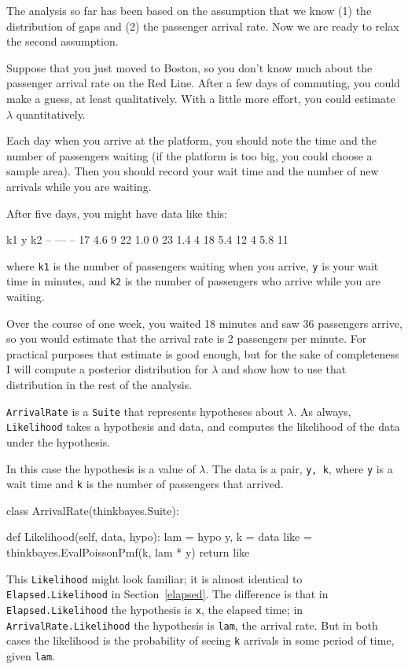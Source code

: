 \documentclass[12pt]{book}
\theoremstyle{exercise}
\begin{document}
The analysis so far has been based on the assumption that we know (1)
the distribution of gaps and (2) the passenger arrival rate.  Now we
are ready to relax the second assumption.

Suppose that you just moved to Boston, so you don't know much about
the passenger arrival rate on the Red Line.  After a few days of
commuting, you could make a guess, at least qualitatively.  With
a little more effort, you could estimate $\lambda$ quantitatively.

Each day when you arrive at the platform, you should note the
time and the number of passengers waiting (if the platform is too
big, you could choose a sample area).  Then you should record your
wait time and the
number of new arrivals while you are waiting.

After five days, you might have data like this:
%
\begin{code}
k1      y     k2
--     ---    --
17     4.6     9
22     1.0     0
23     1.4     4
18     5.4    12
4      5.8    11
\end{code}
%
where {\tt k1} is the number of passengers waiting when you arrive,
{\tt y} is your wait time in minutes, and {\tt k2} is the number of
passengers who arrive while you are waiting.

Over the course of one week, you waited 18 minutes and saw 36
passengers arrive, so you would estimate that the arrival rate is
2 passengers per minute.  For practical purposes that estimate is
good enough, but for the sake of completeness I
will compute a posterior distribution for $\lambda$ and show how
to use that distribution in the rest of the analysis.

{\tt ArrivalRate} is a {\tt Suite} that represents hypotheses about
$\lambda$.  As always, {\tt Likelihood} takes a hypothesis and data,
and computes the likelihood of the data under the hypothesis.

In this case the hypothesis is a value of $\lambda$.  The data is a
pair, {\tt y, k}, where {\tt y} is a wait time and {\tt k} is the
number of passengers that arrived.

\begin{code}
class ArrivalRate(thinkbayes.Suite):

    def Likelihood(self, data, hypo):
        lam = hypo
        y, k = data
        like = thinkbayes.EvalPoissonPmf(k, lam * y)
        return like
\end{code}

This {\tt Likelihood} might look familiar; it
is almost identical to {\tt Elapsed.Likelihood} in
Section~\ref{elapsed}.  The difference is that in {\tt
  Elapsed.Likelihood} the hypothesis is {\tt x}, the elapsed time; in
{\tt ArrivalRate.Likelihood} the hypothesis is {\tt lam}, the arrival
rate.  But in both cases the likelihood is the probability of seeing
{\tt k} arrivals in some period of time, given {\tt lam}.
\end{document}
